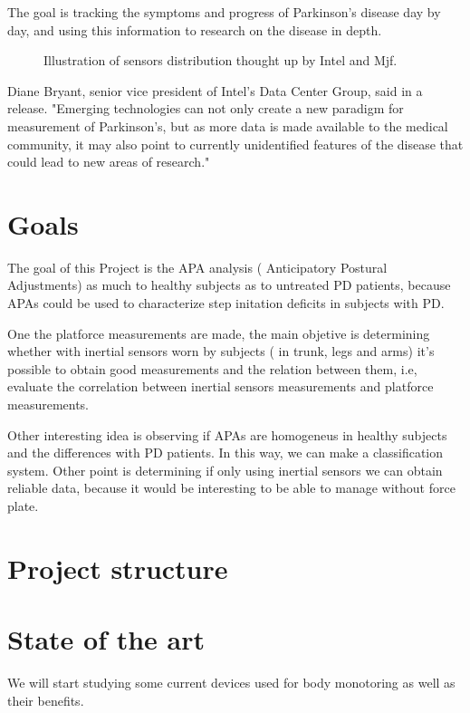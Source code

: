 The goal is tracking the  symptoms and progress of Parkinson’s disease day by day, and using this information to research on the disease in depth.

\begin{figure}[H]
	\centering
	\caption{Illustration of sensors distribution thought up by Intel and Mjf.}
	\label{fig:arte1}
\end{figure}

Diane Bryant, senior vice president of Intel's Data Center Group, said in a release. "Emerging technologies can not only create a new paradigm for measurement of Parkinson's, but as more data is made available to the medical community, it may also point to currently unidentified features of the disease that could lead to new areas of research." \cite{IntelAndMjf}

\section{Goals}

The goal of this Project is the APA analysis ( Anticipatory Postural Adjustments) as much to healthy subjects as to untreated PD patients, because APAs could be used to characterize step initation deficits in subjects with PD.

One the platforce measurements are made, the main objetive is determining whether with inertial sensors worn by subjects ( in trunk, legs and arms) it’s possible to obtain good measurements and the relation between them, i.e, evaluate the correlation between inertial sensors measurements and platforce measurements.

Other interesting idea is observing if APAs are homogeneus in healthy subjects and the differences with  PD patients. In this way, we can make a classification system.
Other point is determining if only using inertial sensors we can obtain reliable data, because it would be interesting to be able to manage without force plate.


\section{Project structure}

\section{State of the art}

We will start studying some current devices used for body monotoring as well as their benefits.

